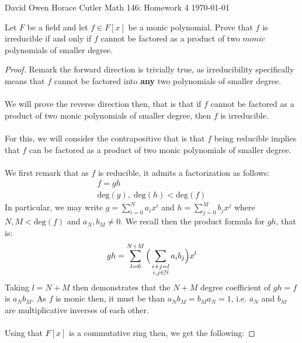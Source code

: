\documentclass[12pt]{article}
\newenvironment{ex}[2][Exercise]{\begin{trivlist}
\item[\hskip \labelsep {\bfseries #1}\hskip \labelsep {\bfseries #2.}]}{\end{trivlist}}
\begin{document}
\noindent David Owen Horace Cutler \hfill {\Large Math 146: Homework 4} \hfill \today

\begin{ex}{1}
    Let $F$ be a field and let $f \in F[x]$ be a monic polynomial. Prove that $f$ is irreducible if and only if $f$ cannot be factored as a product of two $\textit{monic}$ polynomials of smaller degree.
    \begin{proof}
        Remark the forward direction is trivially true, as irreducibility specifically means that $f$ cannot be factored into \textbf{any} two polynomials of smaller degree.
        \\ \\
        We will prove the reverse direction then, that is that if $f$ cannot be factored as a product of two monic polynomials of smaller degree, then $f$ is irreducible.  \\ \\
        For this, we will consider the contrapositive that is that $f$ being reducible implies that $f$ can be factored as a product of two monic polynomials of smaller degree. \\ \\
        We first remark that as $f$ is reducible, it admits a factorization as follows:
        \begin{equation}
            \begin{aligned}
            f = gh \\
            \text{deg}(g), \; \text{deg}(h) < \text{deg}(f)
            \end{aligned}
        \end{equation}
        In particular, we may write $g = \sum_{i = 0}^N a_ix^i$ and $h = \sum_{j = 0}^M b_jx^j$ where $N, M < \text{deg}(f)$ and $a_N, b_M \neq 0$. We recall then the product formula for $gh$, that is:
        \begin{equation}
            gh = \sum_{l = 0}^{N + M} \Big (\sum_{\substack{i + j = l \\ i, j \in \mathbb{N}}} a_ib_j \Big)x^l  \\
        \end{equation}
        Taking $l = N+M$ then demonstrates that the $N + M$ degree coefficient of $gh = f$ is $a_Nb_M$. As $f$ is monic then, it must be than $a_Nb_M = b_Ma_N = 1$, i.e. $a_N$ and $b_M$ are multiplicative inverses of each other. 
        \\ \\ Using that $F[x]$ is a commutative ring then, we get the following:

\end{proof}
\end{ex}
\end{document}
